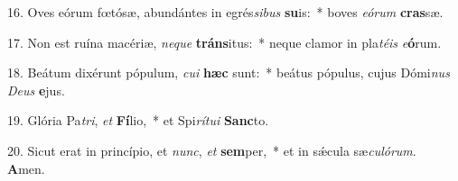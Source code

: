 16. Oves eórum fœtósæ, abundántes in egrés\textit{si}\textit{bus} \textbf{su}is:~*  boves \textit{e}\textit{ó}\textit{rum} \textbf{cras}sæ.\

17. Non est ruína macériæ, \textit{ne}\textit{que} \textbf{tráns}itus:~*  neque clamor in pla\textit{té}\textit{is} \textit{e}\textbf{ó}rum.\

18. Beátum dixérunt pópulum, \textit{cu}\textit{i} \textbf{hæc} sunt:~*  beátus pópulus, cujus Dómi\textit{nus} \textit{De}\textit{us} \textbf{e}jus.\

19. Glória Pa\textit{tri}, \textit{et} \textbf{Fí}lio,~*  et Spi\textit{rí}\textit{tu}\textit{i} \textbf{Sanc}to.\

20. Sicut erat in princípio, et \textit{nunc}, \textit{et} \textbf{sem}per,~*  et in sǽcula sæ\textit{cu}\textit{ló}\textit{rum}. \textbf{A}men.\

